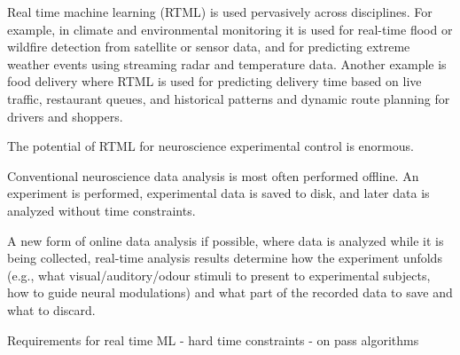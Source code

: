 

Real time machine learning (RTML) is used pervasively across disciplines.
%
For example, in climate and environmental monitoring it is used for real-time
flood or wildfire detection from satellite or sensor data, and for predicting
extreme weather events using streaming radar and temperature data.
%
Another example is food delivery where RTML is used for predicting delivery
time based on live traffic, restaurant queues, and historical patterns and
dynamic route planning for drivers and shoppers.


The potential of RTML for neuroscience experimental control is enormous.

Conventional neuroscience data analysis is most often performed offline. An
experiment is performed, experimental data is saved to disk, and later data is
analyzed without time constraints.


A new form of online data analysis if possible, where data is analyzed while it
is being collected, real-time analysis results determine how the experiment
unfolds (e.g., what visual/auditory/odour stimuli to present to experimental
subjects, how to guide neural modulations) and what part of the recorded data
to save and what to discard.




Requirements for real time ML
- hard time constraints
- on pass algorithms

%

